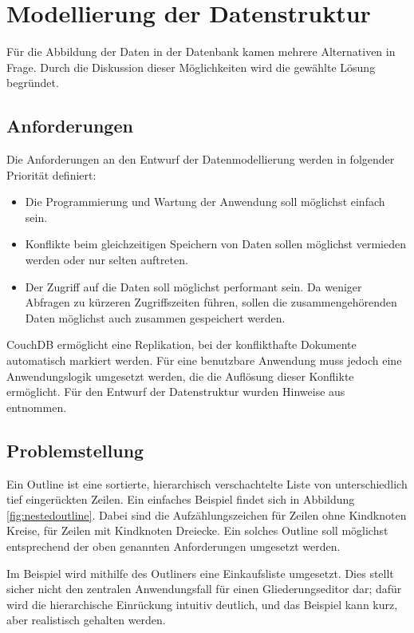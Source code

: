 \section{Modellierung der Datenstruktur}

Für die Abbildung der Daten in der Datenbank kamen mehrere Alternativen in Frage. Durch die Diskussion dieser Möglichkeiten wird die gewählte Lösung begründet.

\subsection{Anforderungen}
\label{subsec:ana-anf}

Die Anforderungen an den Entwurf der Datenmodellierung werden in folgender Priorität definiert:

\begin{itemize}
  \item Die Programmierung und Wartung der Anwendung soll möglichst einfach sein.
  \item Konflikte beim gleichzeitigen Speichern von Daten sollen möglichst vermieden werden oder nur selten auftreten. 
  \item Der Zugriff auf die Daten soll möglichst performant sein. Da weniger Abfragen zu kürzeren Zugriffszeiten führen, sollen die zusammengehörenden Daten möglichst auch zusammen gespeichert werden. 
\end{itemize}

CouchDB ermöglicht eine Replikation, bei der konflikthafte Dokumente automatisch markiert werden. Für eine benutzbare Anwendung muss jedoch eine Anwendungslogik umgesetzt werden, die die Auflösung dieser Konflikte ermöglicht. Für den Entwurf der Datenstruktur wurden Hinweise aus \cite{design:replication} entnommen.

\subsection{Problemstellung}

Ein Outline ist eine sortierte, hierarchisch verschachtelte Liste von unterschiedlich tief eingerückten Zeilen. Ein einfaches Beispiel findet sich in Abbildung \ref{fig:nestedoutline}. Dabei sind die Aufzählungszeichen für Zeilen ohne Kindknoten Kreise, für Zeilen mit Kindknoten Dreiecke. Ein solches Outline soll möglichst entsprechend der oben genannten Anforderungen umgesetzt werden.

Im Beispiel wird mithilfe des Outliners eine Einkaufsliste umgesetzt. Dies stellt sicher nicht den zentralen Anwendungsfall für einen Gliederungseditor dar; dafür wird die hierarchische Einrückung intuitiv deutlich, und das Beispiel kann kurz, aber realistisch gehalten werden.
 
